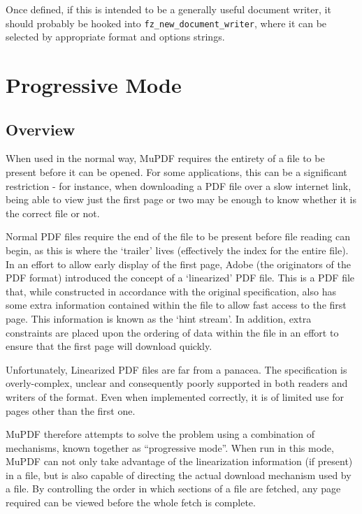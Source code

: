 \documentclass[oneside]{book}
\begin{document}
Once defined, if this is intended to be a generally useful document writer, it should probably be hooked into \texttt{fz\_new\_document\_writer}, where it can be selected by appropriate format and options strings.

\chapter{Progressive Mode}
\label{ProgressiveMode}

\section{Overview}

When used in the normal way, MuPDF requires the entirety of a file to be present before it can be opened. For some applications, this can be a significant restriction - for instance, when downloading a PDF file over a slow internet link, being able to view just the first page or two may be enough to know whether it is the correct file or not.

Normal PDF files require the end of the file to be present before file reading can begin, as this is where the `trailer' lives (effectively the index for the entire file). In an effort to allow early display of the first page, Adobe (the originators of the PDF format) introduced the concept of a `linearized' PDF file. This is a PDF file that, while constructed in accordance with the original specification, also has some extra information contained within the file to allow fast access to the first page. This information is known as the `hint stream'. In addition, extra constraints are placed upon the ordering of data within the file in an effort to ensure that the first page will download quickly.

Unfortunately, Linearized PDF files are far from a panacea. The specification is overly-complex, unclear and consequently poorly supported in both readers and writers of the format. Even when implemented correctly, it is of limited use for pages other than the first one.

MuPDF therefore attempts to solve the problem using a combination of mechanisms, known together as ``progressive mode''. When run in this mode, MuPDF can not only take advantage of the linearization information (if present) in a file, but is also capable of directing the actual download mechanism used by a file. By controlling the order in which sections of a file are fetched, any page required can be viewed before the whole fetch is complete.
\end{document}
